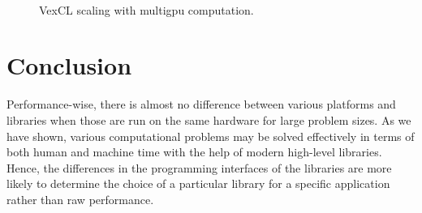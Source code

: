 \documentclass[final]{siamltex}
\begin{document}
\begin{figure}
    \begin{center}
        $\;$
        $\;$
    \end{center}
    \caption{VexCL scaling with multigpu computation.}
    \label{fig:scaling}
\end{figure}


%
%
\section{Conclusion}

Performance-wise, there is almost no difference between various platforms and
libraries when those are run on the same hardware for large problem sizes.
As we have shown, various
computational problems may be solved effectively in terms of both human and
machine time with the help of modern high-level libraries. Hence, the
differences in the programming interfaces of the libraries are more likely to
determine the choice of a particular library for a specific application rather than raw performance.
\end{document}
